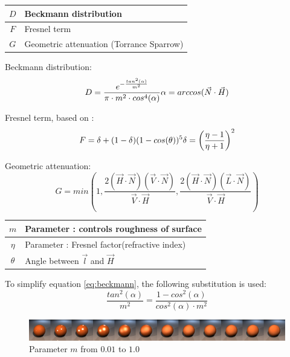 \documentclass[11pt,a4paper]{article}
\begin{document}
\begin{table}[H]
\begin{tabular}{| c | l |}
\hline
$D$ & Beckmann distribution\\ \hline
$F$ & Fresnel term\\ \hline
$G$ & Geometric attenuation (Torrance Sparrow)\\ \hline
\end{tabular}
\end{table}
Beckmann distribution:
\begin{equation}
D = \frac{e^{-\frac{tan^2(\alpha)}{m^2}}}{\pi \cdot m^2 \cdot cos^4(\alpha)}
\label{eq:beckmann}
\\
\alpha = arccos(\vec{N} \cdot \vec{H})
\end{equation}

Fresnel term, based on \cite{Sch94}:
\begin{equation}
F = \delta + (1-\delta)(1-cos(\theta))^5 \\ \delta = \left(\frac{\eta - 1}{\eta+1}\right)^2
\end{equation}


Geometric attenuation:
\begin{equation}
G = min \left(1,\frac{2(\vec{H} \cdot \vec{N})(\vec{V} \cdot \vec{N})}{\vec{V} \cdot \vec{H}},\frac{2 (\vec{H} \cdot \vec{N})(\vec{L} \cdot \vec{N})}{\vec{V} \cdot \vec{H}}\right)
\end{equation}

\begin{table}[H]
\begin{tabular}{| c | l |}
\hline
$m$ & Parameter : controls roughness of surface\\ \hline
$\eta$  & Parameter : Fresnel factor(refractive index)\\ \hline
$\theta$  & Angle between $\vec{l}$ and $\vec{H}$\\ \hline
\end{tabular}
\end{table}
To simplify equation \ref{eq:beckmann}, the following substitution is used:
\begin{equation}
\frac{tan^2(\alpha)}{m^2} = \frac{1- cos^2(\alpha)}{cos^2(\alpha) \cdot m^2}
\end{equation}

\begin{figure}[H]

\includegraphics[width=\textwidth]{ctroughcomplete.png}
\caption{Parameter $m$ from $0.01$ to $1.0$}
\end{figure}
\end{document}
